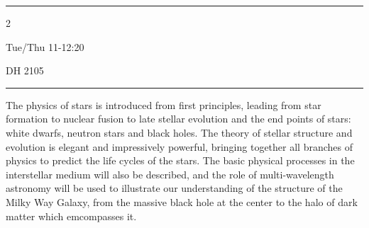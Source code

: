 \documentclass[11pt, a4paper]{article}
\begin{document}
 

\normalfont


  
\hrule     
\vspace{.5cm}

\begin{multicols}{2}
    \begin{description}[labelindent=0.00in,leftmargin=1.25in,rightmargin=0.0in,style=nextline]
		\item[\textsc{Instructor}:] \instructor
        \item[\textsc{E-mail}:] \email
        \item[] 
        \item[\textsc{Class Time}:] Tue/Thu 11-12:20 
        \item[] 
        \item[\textsc{Office}:]  \office
        \item[\textsc{Office Hours}:] \hours
        \item[] 
        \item[\textsc{Class Room}:] DH 2105
        \item[] 
    \end{description}
\end{multicols}
\hrule        
\vspace{.2cm}

\noindent The physics of stars is introduced from first principles, leading from
star formation to nuclear fusion to late stellar evolution and the end points of
stars: white dwarfs, neutron stars and black holes. The theory of stellar
structure and evolution is elegant and impressively powerful, bringing together
all branches of physics to predict the life cycles of the stars. The basic
physical processes in the interstellar medium will also be described, and the
role of multi-wavelength astronomy will be used to illustrate our understanding
of the structure of the Milky Way Galaxy, from the massive black hole at the
center to the halo of dark matter which emcompasses it.
\end{document}
